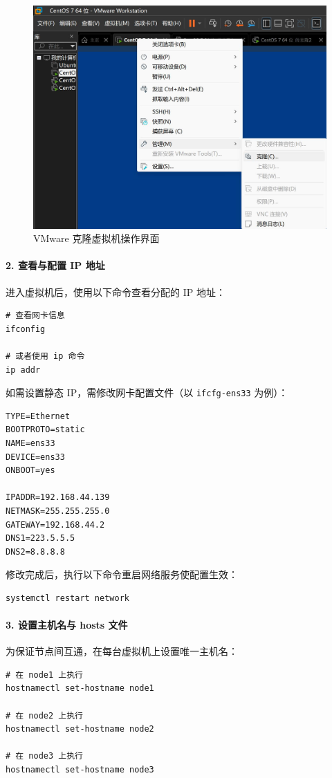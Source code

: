 \documentclass[]{bitreport}
\begin{document}
\begin{figure}[H]
  \centering
  \includegraphics[width=0.9\linewidth]{figures/Clone.jpg}
  \caption{VMware 克隆虚拟机操作界面}
  \label{fig:clone_vm}
\end{figure}

\paragraph{2. 查看与配置 IP 地址}
进入虚拟机后，使用以下命令查看分配的 IP 地址：
\begin{lstlisting}[style=shell]
# 查看网卡信息
ifconfig

# 或者使用 ip 命令
ip addr
\end{lstlisting}

如需设置静态 IP，需修改网卡配置文件（以 \texttt{ifcfg-ens33} 为例）：
\begin{lstlisting}[style=shell]
TYPE=Ethernet
BOOTPROTO=static
NAME=ens33
DEVICE=ens33
ONBOOT=yes

IPADDR=192.168.44.139
NETMASK=255.255.255.0
GATEWAY=192.168.44.2
DNS1=223.5.5.5
DNS2=8.8.8.8
\end{lstlisting}

修改完成后，执行以下命令重启网络服务使配置生效：
\begin{lstlisting}[style=shell]
systemctl restart network
\end{lstlisting}

\paragraph{3. 设置主机名与 hosts 文件}
为保证节点间互通，在每台虚拟机上设置唯一主机名：
\begin{lstlisting}[style=shell]
# 在 node1 上执行
hostnamectl set-hostname node1

# 在 node2 上执行  
hostnamectl set-hostname node2

# 在 node3 上执行
hostnamectl set-hostname node3
\end{lstlisting}
\end{document}
